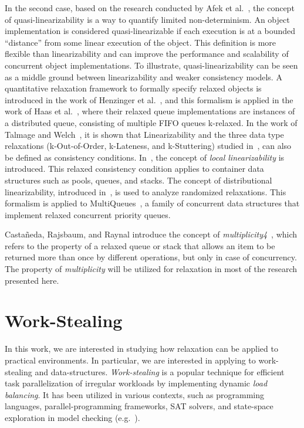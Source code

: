 In the second case, based on the research conducted by Afek et al.~\cite{DBLP_conf_opodis_AfekKY10}, the concept of quasi-linearizability is a way to quantify limited non-determinism. An object implementation is considered quasi-linearizable if each execution is at a bounded ``distance'' from some linear execution of the object. This definition is more flexible than linearizability and can improve the performance and scalability of concurrent object implementations. To illustrate, quasi-linearizability can be seen as a middle ground between linearizability and weaker consistency models. A quantitative relaxation framework to formally specify relaxed objects is introduced in the work of Henzinger et al.~\cite{DBLP_conf_popl_HenzingerKPSS13}, and this formalism is applied in the work of Haas et al.~\cite{DBLP_conf_cf_HaasLHPSKS13}, where their relaxed queue implementations are instances of a distributed queue, consisting of multiple FIFO queues k-relaxed. In the work of Talmage and Welch~\cite{DBLP_journals_algorithms_TalmageW18}, it is shown that Linearizability and the three data type relaxations (k-Out-of-Order, k-Lateness, and k-Stuttering) studied in~\cite{DBLP_conf_popl_HenzingerKPSS13},  can also be defined as consistency conditions. In~\cite{DBLP_conf_concur_HaasHHKLPSSV16}, the concept of \textit{local linearizability} is introduced. This relaxed consistency condition applies to container data structures such as pools, queues, and stacks.  The concept of distributional linearizability, introduced in~\cite{DBLP_conf_spaa_Alistarh0KLN18}, is used to analyze randomized relaxations. This formalism is applied to MultiQueues~\cite{DBLP_conf_spaa_RihaniSD15}, a family of concurrent data structures that implement relaxed concurrent priority queues.

Castañeda, Rajsbaum, and Raynal introduce the concept of \emph{multiplicity4}~\cite{DBLP_conf_opodis_CastanedaRR20}, which refers to the property of a relaxed queue or stack that allows an item to be returned more than once by different operations, but only in case of concurrency. The property of \emph{multiplicity} will be utilized for relaxation in most of the research presented here.

\section{\label{section:work-stealing}Work-Stealing}

In this work, we are interested in studying how relaxation can be applied to practical environments. In particular, we are interested in applying to work-stealing and data-structures. \emph{Work-stealing} is a popular technique for efficient task parallelization of irregular workloads by implementing dynamic \emph{load balancing}. It has been utilized in various contexts, such as programming languages, parallel-programming frameworks, SAT solvers, and state-space exploration in model checking (e.g.~\cite{DBLP_journals_tpds_AyguadeCDHLMTUZ09,
  DBLP_journals_jpdc_BlumofeJKLRZ96, DBLP_journals_tpds_AyguadeCDHLMTUZ09, DBLP_conf_jvm_FloodDSZ01, DBLP_conf_pldi_FrigoLR98, DBLP_conf_java_Lea00, DBLP_conf_hpca_RangerRPBK07}).

